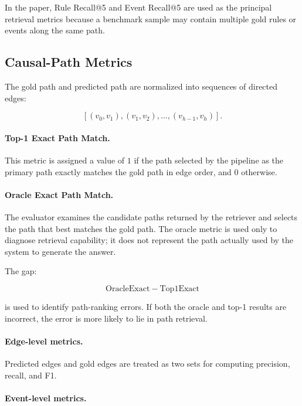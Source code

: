 In the paper, Rule Recall@5 and Event Recall@5 are used as the principal
retrieval metrics because a benchmark sample may contain multiple gold rules
or events along the same path.

\subsection{Causal-Path Metrics}

The gold path and predicted path are normalized into sequences of directed
edges:

\[
\left[
(v_0,v_1),
(v_1,v_2),
\ldots,
(v_{h-1},v_h)
\right].
\]

\paragraph{Top-1 Exact Path Match.}

This metric is assigned a value of \(1\) if the path selected by the pipeline
as the primary path exactly matches the gold path in edge order, and \(0\)
otherwise.

\paragraph{Oracle Exact Path Match.}

The evaluator examines the candidate paths returned by the retriever and
selects the path that best matches the gold path. The oracle metric is used
only to diagnose retrieval capability; it does not represent the path actually
used by the system to generate the answer.

The gap:

\[
\mathrm{OracleExact}
-
\mathrm{Top1Exact}
\]

is used to identify path-ranking errors. If both the oracle and top-1 results
are incorrect, the error is more likely to lie in path retrieval.

\paragraph{Edge-level metrics.}

Predicted edges and gold edges are treated as two sets for computing precision,
recall, and F1.

\paragraph{Event-level metrics.}

